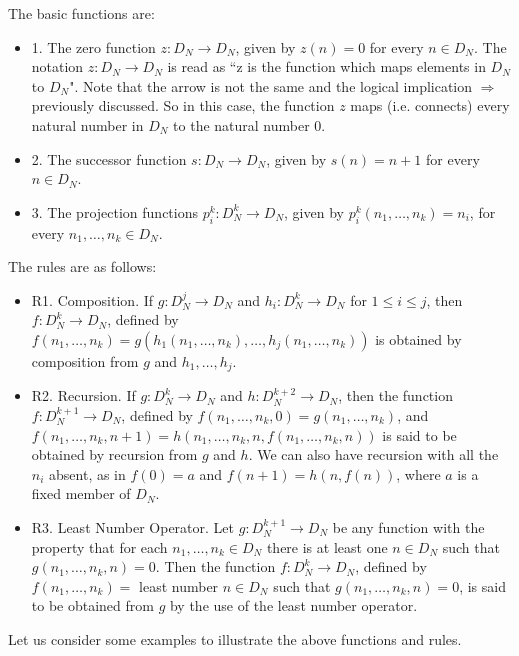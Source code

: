 The basic functions are:
\begin{itemize}
\item 1. The zero function $z: D_{N} \rightarrow D_{N}$, given by $z(n)=0$ for every $n \in D_{N}$.  The notation $z: D_{N} \rightarrow D_{N}$ is read as ``z is the function which maps elements in $D_{N}$ to $D_{N}$". Note that the arrow is not the same and the logical implication $\Longrightarrow$ previously discussed.  So in this case, the function $z$ maps (i.e. connects) every natural number in $D_{N}$ to the natural number $0$.
\item 2. The successor function $s: D_{N} \rightarrow D_{N}$, given by $s(n)=n+1$ for every $n \in D_{N}$.
\item 3. The projection functions $p_{i}^{k}: D_{N}^{k} \rightarrow D_{N}$, given by $p_{i}^{k}(n_{1}, \ldots,n_{k})=n_{i}$, for every $n_{1}, \ldots, n_{k} \in D_{N}$.
\end{itemize}

The rules are as follows:
\begin{itemize}
\item R1.  Composition.  If $g: D_{N}^{j} \rightarrow D_{N}$ and $h_{i}:D_{N}^{k} \rightarrow D_{N}$ for $1 \le i \le j$, then $f:D_{N}^{k} \rightarrow D_{N}$, defined by $f(n_{1}, \ldots, n_{k})=g(h_{1}(n_{1},\ldots,n_{k}), \ldots , h_{j}(n_{1}, \ldots, n_{k}))$ is obtained by composition from $g$ and $h_{1}, \ldots, h_{j}$.
\item R2. Recursion. If $g:D_{N}^{k} \rightarrow D_{N}$ and $h:D_{N}^{k+2} \rightarrow D_{N}$, then the function $f: D_{N}^{k+1} \rightarrow D_{N}$, defined by $f(n_{1}, \ldots, n_{k},0)=g(n_{1}, \ldots, n_{k})$, and $f(n_{1}, \ldots, n_{k}, n+1)=h(n_{1}, \ldots, n_{k}, n, f(n_{1}, \ldots, n_{k}, n))$ is said to be obtained by recursion from $g$ and $h$.  We can also have recursion with all the $n_{i}$ absent, as in $f(0)=a$ and $f(n+1)=h(n,f(n))$, where $a$ is a fixed member of $D_{N}$.
\item R3. Least Number Operator.  Let $g:D_{N}^{k+1} \rightarrow D_{N}$ be any function with the property that for each $n_{1}, \ldots, n_{k} \in D_{N}$ there is at least one $n \in D_{N}$ such that $g(n_{1}, \ldots, n_{k}, n)=0$.  Then the function $f:D_{N}^{k} \rightarrow D_{N}$, defined by $f(n_{1}, \ldots, n_{k})=$ least number $n \in D_{N}$ such that $g(n_{1}, \ldots, n_{k}, n)=0$, is said to be obtained from $g$ by the use of the least number operator.
\end{itemize}

Let us consider some examples to illustrate the above functions and rules.\\

